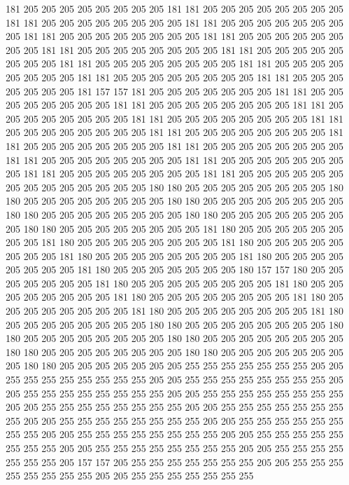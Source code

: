 181 205 205 205 205 205 205 205 205 181 181 205 205 205 205 205 205 205 205 181
181 205 205 205 205 205 205 205 205 181 181 205 205 205 205 205 205 205 205 181
181 205 205 205 205 205 205 205 205 181 181 205 205 205 205 205 205 205 205 181
181 205 205 205 205 205 205 205 205 181 181 205 205 205 205 205 205 205 205 181
181 205 205 205 205 205 205 205 205 181 181 205 205 205 205 205 205 205 205 181
181 205 205 205 205 205 205 205 205 181 181 205 205 205 205 205 205 205 181 157
157 181 205 205 205 205 205 205 205 181 181 205 205 205 205 205 205 205 205 181
181 205 205 205 205 205 205 205 205 181 181 205 205 205 205 205 205 205 205 181
181 205 205 205 205 205 205 205 205 181 181 205 205 205 205 205 205 205 205 181
181 205 205 205 205 205 205 205 205 181 181 205 205 205 205 205 205 205 205 181
181 205 205 205 205 205 205 205 205 181 181 205 205 205 205 205 205 205 205 181
181 205 205 205 205 205 205 205 205 181 181 205 205 205 205 205 205 205 205 181
181 205 205 205 205 205 205 205 205 205 205 205 205 205 205 180 180 205 205 205
205 205 205 205 205 180 180 205 205 205 205 205 205 205 205 180 180 205 205 205
205 205 205 205 205 180 180 205 205 205 205 205 205 205 205 180 180 205 205 205
205 205 205 205 205 180 180 205 205 205 205 205 205 205 205 181 180 205 205 205
205 205 205 205 205 181 180 205 205 205 205 205 205 205 205 181 180 205 205 205
205 205 205 205 205 181 180 205 205 205 205 205 205 205 205 181 180 205 205 205
205 205 205 205 205 181 180 205 205 205 205 205 205 205 180 157 157 180 205 205
205 205 205 205 205 181 180 205 205 205 205 205 205 205 205 181 180 205 205 205
205 205 205 205 205 181 180 205 205 205 205 205 205 205 205 181 180 205 205 205
205 205 205 205 205 181 180 205 205 205 205 205 205 205 205 181 180 205 205 205
205 205 205 205 205 180 180 205 205 205 205 205 205 205 205 180 180 205 205 205
205 205 205 205 205 180 180 205 205 205 205 205 205 205 205 180 180 205 205 205
205 205 205 205 205 180 180 205 205 205 205 205 205 205 205 180 180 205 205 205
205 205 205 205 255 255 255 255 255 255 255 205 205 255 255 255 255 255 255 255
255 205 205 255 255 255 255 255 255 255 255 205 205 255 255 255 255 255 255 255
255 205 205 255 255 255 255 255 255 255 255 205 205 255 255 255 255 255 255 255
255 205 205 255 255 255 255 255 255 255 255 205 205 255 255 255 255 255 255 255
255 205 205 255 255 255 255 255 255 255 255 205 205 255 255 255 255 255 255 255
255 205 205 255 255 255 255 255 255 255 255 205 205 255 255 255 255 255 255 255
255 205 205 255 255 255 255 255 255 255 205 157 157 205 255 255 255 255 255 255
255 205 205 255 255 255 255 255 255 255 255 205 205 255 255 255 255 255 255 255
